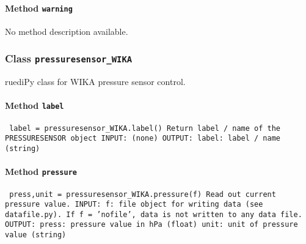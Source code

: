 \paragraph{Method \texttt{warning}}
\vspace{1ex}
No method description available.\par

\subsubsection{Class \texttt{pressuresensor_WIKA}}
\par
ruediPy class for WIKA pressure sensor control.\par

\paragraph{Method \texttt{label}}
\vspace{1ex}
\texttt{\newline
label = pressuresensor_WIKA.label()\newline
\newline
Return label / name of the PRESSURESENSOR object\newline
\newline
INPUT:\newline
(none)\newline
\newline
OUTPUT:\newline
label: label / name (string)\newline
\newline
}

\paragraph{Method \texttt{pressure}}
\vspace{1ex}
\texttt{\newline
press,unit = pressuresensor_WIKA.pressure(f)\newline
\newline
Read out current pressure value.\newline
\newline
INPUT:\newline
f: file object for writing data (see datafile.py). If f = 'nofile', data is not written to any data file.\newline
\newline
OUTPUT:\newline
press: pressure value in hPa (float)\newline
unit: unit of pressure value (string)\newline
\newline
}

